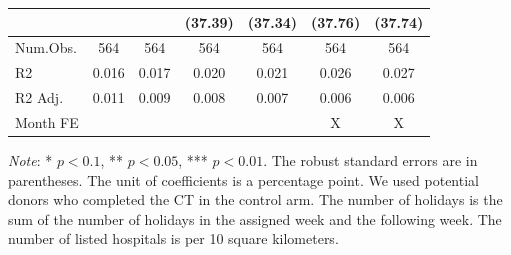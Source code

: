 \documentclass[12pt, a4paper]{article}
\begin{document}
\begin{table}[H]
\begin{threeparttable}
\begin{tabular}[t]{lcccccc}
 &  &  & (\num{37.39}) & (\num{37.34}) & (\num{37.76}) & (\num{37.74})\\
\midrule
Num.Obs. & \num{564} & \num{564} & \num{564} & \num{564} & \num{564} & \num{564}\\
R2 & \num{0.016} & \num{0.017} & \num{0.020} & \num{0.021} & \num{0.026} & \num{0.027}\\
R2 Adj. & \num{0.011} & \num{0.009} & \num{0.008} & \num{0.007} & \num{0.006} & \num{0.006}\\
Month FE &  &  &  &  & X & X\\
\bottomrule
\end{tabular}
\begin{tablenotes}
\item \emph{Note}: * $p < 0.1$, ** $p < 0.05$, *** $p < 0.01$. The robust standard errors are in parentheses. The unit of coefficients is a percentage point. We used potential donors who completed the CT in the control arm. The number of holidays is the sum of the number of holidays in the assigned week and the following week. The number of listed hospitals is per 10 square kilometers.
\end{tablenotes}
\end{threeparttable}
\end{table}

\begin{spacing}{1}
  
\end{spacing}
\end{document}
